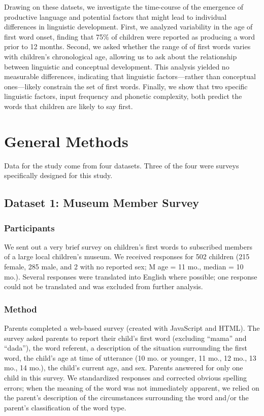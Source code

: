 \documentclass[10pt,letterpaper]{article}
\begin{document}
Drawing on these datsets, we investigate the time-course of the emergence of productive language and potential factors that might lead to individual differences in linguistic development. First, we analyzed variability in the age of first word onset, finding that 75\% of children were reported as producing a word prior to 12 months. Second, we asked whether the range of of first words varies with children's chronological age, allowing us to ask about the relationship between linguistic and conceptual development. This analysis yielded no measurable differences, indicating that linguistic factors---rather than conceptual ones---likely constrain the set of first words. Finally, we show that two specific linguistic factors, input frequency and phonetic complexity, both predict the words that children are likely to say first.

\section{General Methods}

Data for the study come from four datasets. Three of the four were surveys specifically designed for this study. 

\subsection{Dataset 1: Museum Member Survey}

\subsubsection{Participants}

We sent out a very brief survey on children's first words to subscribed members of a large local children's museum. We received responses for 502 children (215 female, 285 male, and 2 with no reported sex; M age = 11 mo., median = 10 mo.). Several responses were translated into English where possible; one response could not be translated and was excluded from further analysis. 

\subsubsection{Method}

Parents completed a web-based survey (created with JavaScript and HTML). The survey asked parents to report their child's first word (excluding ``mama'' and ``dada''), the word referent, a description of the situation surrounding the first word, the child's age at time of utterance (10 mo. or younger, 11 mo., 12 mo., 13 mo., 14 mo.), the child's current age, and sex. Parents answered for only one child in this survey. We standardized responses and corrected obvious spelling errors; when the meaning of the word was not immediately apparent, we relied on the parent's description of the circumstances surrounding the word and/or the parent's classification of the word type.
\end{document}
